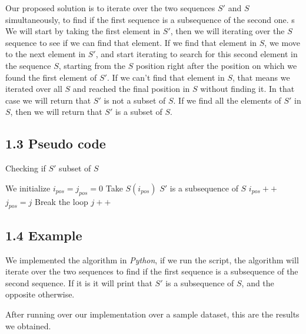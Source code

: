 \documentclass{article}
\begin{document}
Our proposed solution is to iterate over the two sequences $S'$ and $S$ simultaneously, to find if the first sequence is a subsequence of the second one.
s
We will start by taking the first element in $S'$, then we will iterating over the $S$ sequence to see if we can find that element. If we find that element in $S$, we move to the next element in $S'$, and start iterating to search for this second element in the sequence $S$, starting from the $S$ position right after the position on which we found the first element of $S'$. If we can't find that element in $S$, that means we iterated over all $S$ and reached the final position in $S$ without finding it. In that case we will return that $S'$ is not a subset of $S$. If we find all the elements of $S'$ in $S$, then we will return that $S'$ is a subset of $S$.

\subsection*{1.3 Pseudo code}

\begin{algorithm}[H]
\caption{Checking if $S'$ subset of $S$}
\begin{algorithmic}[1]
\State We initialize $i_{pos} = j_{pos} = 0$
 \State Take $S(i_{pos})$
    \State $S'$ is a subsequence of $S$
   \EndIf
    \State $i_{pos}++$
    \State $j_{pos} = j$
    \State Break the loop
   \EndIf
  \EndIf
   \State $j++$
  \EndIf
 \EndFor
\EndWhile
\end{algorithmic}
\end{algorithm}

\subsection*{1.4 Example}

We implemented the algorithm in \textit{Python}, if we run the script, the algorithm will iterate over the two sequences to find if the first sequence is a subsequence of the second sequence. If it is it will print that $S'$ is a subsequence of $S$, and the opposite otherwise.



After running over our implementation over a sample dataset, this are the results we obtained.
\end{document}
